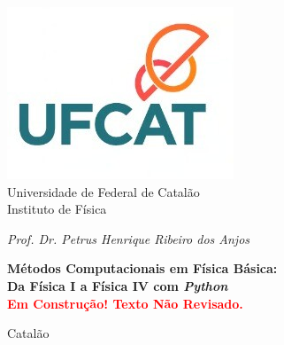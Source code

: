 	\pagestyle{empty}
	\baselineskip 0.7cm
	
	\begin{titlepage}
		\begin{center}
			\includegraphics[scale=0.5]{Images/UFCat-logo.jpeg}\\
			{\large\sc Universidade de Federal de Catalão\\
				Instituto de Física}
		\end{center}
		
		\vspace{3.0cm}
		
		\begin{center}
			{\large\em Prof. Dr. Petrus Henrique Ribeiro dos Anjos}
		\end{center}
		
		\vspace{3.0cm}
		
		\begin{center}
			{\large \sc\bf  Métodos Computacionais em Física Básica:\\
			Da Física I a Física IV com {\it Python}\\
			\textcolor{red}{Em Construção! Texto Não Revisado.}}
		\end{center}
		
		
		
		
		
		\vspace{5.0cm}
		
		\begin{center}{\large\sc Catalão}\end{center}
		\begin{center}{\large{}}\end{center}
		
	\end{titlepage}
	
	\newpage
	
	

